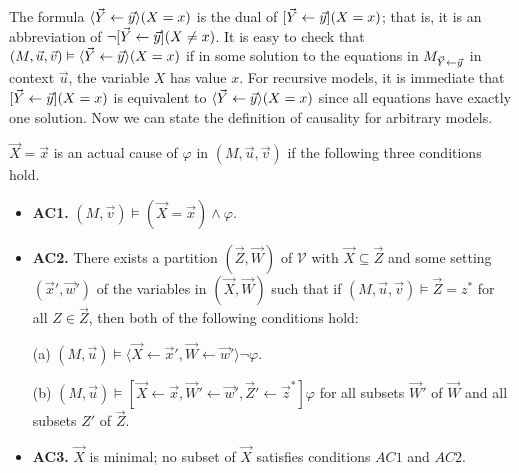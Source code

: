 \documentclass{article}
\begin{document}
The formula $\langle \vec Y \leftarrow \vec y \rangle(X=x)$ is the dual
of $[\vec Y \leftarrow \vec y](X=x)$; that is, it is an abbreviation of
$\neg [\vec Y \leftarrow \vec y](X \neq x)$.
It is easy to check that
$(M,\vec u, \vec v) \vDash \langle \vec Y \leftarrow \vec y \rangle(X=x)$
if in some solution to the equations in $M_{\vec Y \leftarrow \vec y}$ in
context $\vec u$, the variable $X$ has value $x$.
For recursive models, it is immediate that
$[\vec Y \leftarrow \vec y](X = x)$ is equivalent to
$\langle \vec Y \leftarrow \vec y \rangle(X=x)$ since all equations
have exactly one solution.
Now we can state the definition of causality for arbitrary models.
\begin{definition}
    $\vec X = \vec x$ is an actual cause of $\varphi$ in
    $(M,\vec u, \vec v) $ if the following three conditions hold.

    \begin{itemize}
        \item  \textbf{AC1.} $(M,\vec v)\models (\vec X = \vec x) \wedge \varphi$.
        \item  \textbf{AC2. }There exists a partition $(\vec Z, \vec W)$ of $\mathcal{V}$ with $\vec X \subseteq \vec Z$ and some setting $(\vec x',\vec w')$ of the variables in $(\vec X,\vec W)$ such that if $(M,\vec u, \vec v)\models \vec Z = z^*$ for all $Z\in \vec Z$, then both of the following conditions hold:

              (a) $(M,\vec u)\models \langle \vec X \leftarrow \vec x', \vec W \leftarrow \vec w' \rangle \neg \varphi$.

              (b) $(M,\vec u)\models[\vec X\leftarrow \vec x, \vec W' \leftarrow \vec w', \vec Z'\leftarrow \vec z^*]\varphi$ for all subsets $\vec W'$ of $\vec W$ and all subsets $Z'$ of $\vec Z$.

        \item  \textbf{AC3.} $\vec X$ is minimal; no subset of $\vec X$ satisfies conditions $AC1$ and $AC2$.
    \end{itemize}
\end{definition}
\end{document}
